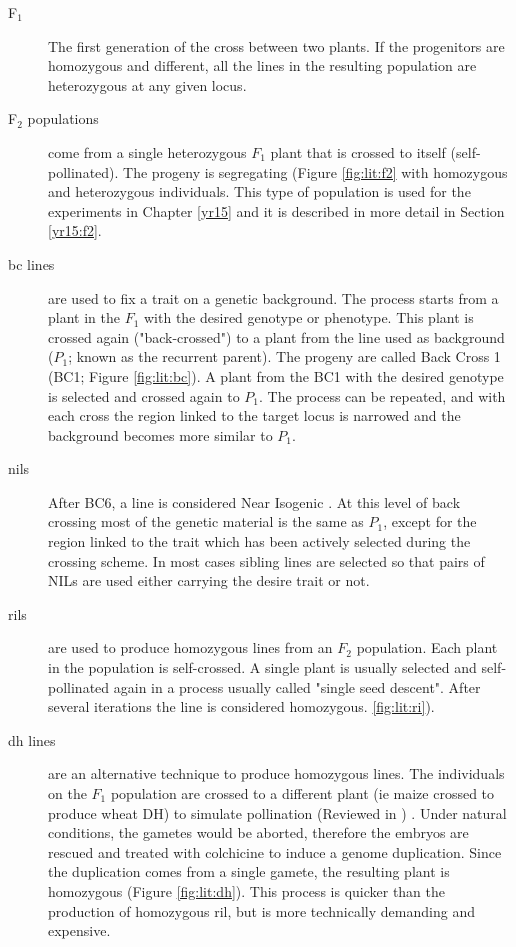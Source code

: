 \begin{description}
\item[F$_{1}$] The first generation of the cross between two plants. If the progenitors are homozygous and different, all the lines in the resulting population are heterozygous at any given locus. 
\item[F$_{2}$ populations] come from a single heterozygous $F_{1}$ plant that is crossed to itself (self-pollinated). The progeny is segregating (Figure \ref{fig:lit:f2} with homozygous and heterozygous individuals. This type of population is used for the experiments in Chapter \ref{yr15} and it is described in more detail in Section \ref{yr15:f2}. 
\item[\gls{bc} lines] are used to fix a trait on a genetic background. The process starts from a plant in the $F_{1}$ with the desired genotype or phenotype. This plant is crossed again ("back-crossed") to a plant from the line used as background ($P_{1}$; known as the recurrent parent). The progeny are called Back Cross 1 (BC1; Figure \ref{fig:lit:bc}). A plant from the BC1 with the desired genotype is selected and crossed again to $P_{1}$. The process can be repeated, and with each cross the region linked to the target locus is narrowed and the background becomes more similar to $P_{1}$. 
\item[\glspl{nil}] After BC6, a line is considered Near Isogenic \citep{Stam1981}. At this level of back crossing most of the genetic material is the same as $P_{1}$, except for the region linked to the trait which has been actively selected during the crossing scheme. In most cases sibling lines are selected so that pairs of NILs are used either carrying the desire trait or not. 
\item[\glspl{ril}] are used to produce homozygous lines from an $F_{2}$ population. Each plant in the population is self-crossed. A single plant is usually selected and self-pollinated again in a process usually called "single seed descent". After several iterations the line is considered homozygous. \ref{fig:lit:ri}).
\item[\gls{dh} lines ] are an alternative technique to produce homozygous lines. The individuals on the $F_{1}$ population are crossed to a different plant (ie maize crossed to produce wheat DH) to simulate pollination  (Reviewed in \citealt{Niu2014}) . Under natural conditions, the gametes would be aborted, therefore the embryos are rescued and treated with colchicine to induce a genome duplication. Since the duplication comes from a single gamete, the resulting plant is homozygous (Figure \ref{fig:lit:dh}). This process is quicker than the production of homozygous \gls{ril}, but is more technically demanding and expensive. 

 
\end{description}

